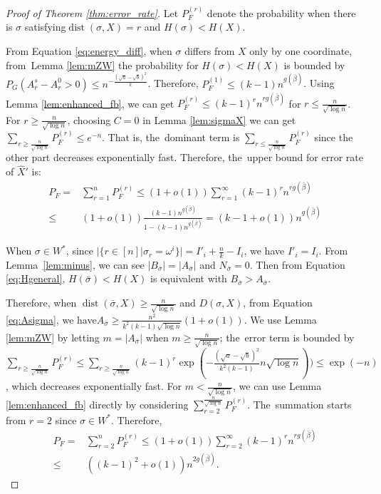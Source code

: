 \documentclass[entropy,article,accept,moreauthors,pdftex]{Definitions/mdpi}
\newcommand{\1}{\mathbbm{1}}
\DeclareMathOperator{\Dist}{dist}
\begin{document}
\begin{paracol}{2}
\begin{proof}[Proof of Theorem \ref{thm:error_rate}]
	Let $P_F^{(r)}$ denote the probability when there is $\sigma$ satisfying\linebreak $\Dist(\sigma, X) = r$ and $H(\sigma) < H(X)$.
	
	From Equation \eqref{eq:energy_diff}, when $\sigma$ differs from $X$ only by one coordinate, from~Lemma \ref{lem:mZW} the probability for $H(\sigma) < H(X)$ is
	bounded by $P_G(A_r^s - A_r^0 > 0) \leq n^{-\frac{(\sqrt{a}-\sqrt{b})^2}{k}}$. Therefore, $P_F^{(1)}  \leq (k-1)n^{g(\bar{\beta})}$.
	Using Lemma \ref{lem:enhanced_fb}, we can get $P_F^{(r)} \leq (k-1)^r n^{rg(\bar{\beta})}$ for $ r \leq \frac{n}{\sqrt{\log n}}$.
	For $ r \geq \frac{n}{\sqrt{\log n}}$, choosing $C=0$ in Lemma \ref{lem:sigmaX} we can get $\sum_{r\geq \frac{n}{\sqrt{\log n}}}P_F^{(r)} \leq e^{-n}$.
	That is, the~dominant term is $\sum_{r\leq \frac{n}{\sqrt{\log n}}}P_F^{(r)}$ since the other part decreases exponentially fast.
	Therefore, the~upper bound for error rate of $\hat{X}'$ is:
	\begin{align*}
	P_F = & \sum_{r=1}^n P_F^{(r)} \leq (1+o(1)) \sum_{r=1}^{\infty} (k-1)^r n^{rg(\bar{\beta})}\\
	\leq & (1+o(1))\frac{(k-1) n^{g(\bar{\beta})}}{1-(k-1) n^{g(\bar{\beta})}} = (k-1+o(1))n^{g(\bar{\beta})}
	\end{align*}
	
When $\sigma \in W^*$, since $|\{r\in [n] | \sigma_r = \omega^i \}| = I'_i + \frac{n}{k} - I_i $, we have $I'_i = I_i$.
From \mbox{Lemma \ref{lem:minus}}, we can see  $|B_{\bar{\sigma}}| = |A_{\bar{\sigma}}|$
and $N_{\bar{\sigma}} = 0$. Then from Equation \eqref{eq:Hgeneral}, $H(\bar{\sigma}) < H(X)$ is equivalent with $B_{\bar{\sigma}} > A_{\bar{\sigma}}$.

Therefore, when $ \Dist(\bar{\sigma}, X) \geq \frac{n}{\sqrt{\log n} }$ and $D(\sigma, X)$,
from Equation \eqref{eq:Asigma}, we have\linebreak $A_{\bar{\sigma}} \geq \frac{n^2}{k^2(k-1)\sqrt{\log n} } (1+o(1))$.
We use Lemma \ref{lem:mZW} by letting $m=|A_{\bar{\sigma}}|$ when $m \geq \frac{n}{ \sqrt{\log n}}$; the~error term is bounded
by $\sum_{r\geq \frac{n}{ \sqrt{\log n}}} P_F^{(r)} \leq \sum_{r\geq \frac{n}{ \sqrt{\log n}}} (k-1)^r \exp(-\frac{(\sqrt{a} - \sqrt{b})^2}{k^2(k-1)} n \sqrt{\log n}))
\leq \exp(-n)$, which decreases exponentially fast.
For $m < \frac{n}{ \sqrt{\log n}}$, we can use Lemma \ref{lem:enhanced_fb} directly 
by considering $\sum_{r=2}^{\frac{n}{ \sqrt{\log n}}} P_F^{(r)}$. The~summation starts from $r=2$ since $\sigma \in W^*$.
Therefore,
\begin{align*}
P_F = & \sum_{r=2}^n P_F^{(r)} \leq (1+o(1)) \sum_{r=2}^{\infty} (k-1)^r n^{rg(\bar{\beta})}\\
\leq & ((k-1)^2+o(1))n^{2g(\bar{\beta})}.
\end{align*}
\end{proof}


\end{paracol}
\end{document}
